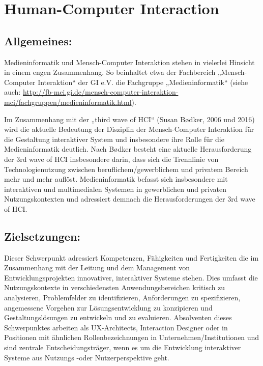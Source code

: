 \chapter{Human-Computer Interaction}\label{human-computer-interaction}

\section*{Allgemeines:}\label{allgemeines}

Medieninformatik und Mensch-Computer Interaktion stehen in vielerlei
Hinsicht in einem engen Zusammenhang. So beinhaltet etwa der Fachbereich
„Mensch-Computer Interaktion`` der GI e.V. die Fachgruppe
„Medieninformatik`` (siehe auch:
\href{http://fb-mci.gi.de/mensch-computer-interaktion-mci/fachgruppen/medieninformatik.html}{http://fb-mci.gi.de/mensch-computer-interaktion-mci/fachgruppen/medieninformatik.html}).

Im Zusammenhang mit der „third wave of HCI`` (Susan Bødker, 2006 und
2016) wird die aktuelle Bedeutung der Disziplin der Mensch-Computer
Interaktion für die Gestaltung interaktiver System und insbesondere ihre
Rolle für die Medieninformatik deutlich. Nach Bødker besteht eine
aktuelle Herausforderung der 3rd wave of HCI insbesondere darin, dass
sich die Trennlinie von Technologienutzung zwischen
beruflichem/gewerblichem und privatem Bereich mehr und mehr auflöst.
Medieninformatik befasst sich insbesondere mit interaktiven und
multimedialen Systemen in gewerblichen und privaten Nutzungskontexten
und adressiert demnach die Herausforderungen der 3rd wave of HCI.

\section*{Zielsetzungen:}\label{zielsetzungen}

Dieser Schwerpunkt adressiert Kompetenzen, Fähigkeiten und Fertigkeiten
die im Zusammenhang mit der Leitung und dem Management von
Entwicklungsprojekten innovativer, interaktiver Systeme stehen. Dies
umfasst die Nutzungskontexte in verschiedensten Anwendungsbereichen
kritisch zu analysieren, Problemfelder zu identifizieren, Anforderungen
zu spezifizieren, angemessene Vorgehen zur Lösungsentwicklung zu
konzipieren und Gestaltungslösungen zu entwickeln und zu evaluieren.
Absolventen dieses Schwerpunktes arbeiten als UX-Architects, Interaction
Designer oder in Positionen mit ähnlichen Rollenbezeichnungen in
Unternehmen/Institutionen und sind zentrale Entscheidungsträger, wenn es
um die Entwicklung interaktiver Systeme aus Nutzungs -oder
Nutzerperspektive geht.

